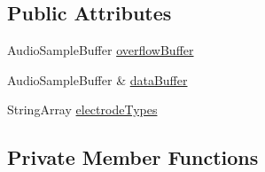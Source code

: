 \subsection*{Public Attributes}
\begin{DoxyCompactItemize}
\item 
Audio\-Sample\-Buffer \hyperlink{classSpikeDetector_a789328f70cc6f1de8f0b862189ce23bd}{overflow\-Buffer}
\item 
Audio\-Sample\-Buffer \& \hyperlink{classSpikeDetector_a050b87d647b7d12dd76e6e4fde9f932f}{data\-Buffer}
\item 
String\-Array \hyperlink{classSpikeDetector_a23eaf5359b4d13f75a16a28190014619}{electrode\-Types}
\end{DoxyCompactItemize}
\subsection*{Private Member Functions}
